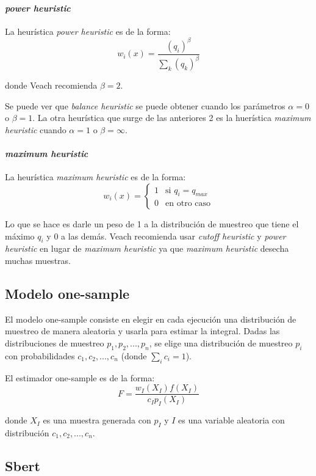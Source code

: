 \documentclass{article}
\begin{document}
\paragraph{\textit{power heuristic}} La heurística \textit{power heuristic} es de la forma:
$$ w_{i}(x) = \frac{(q_{i})^{\beta}}{\sum_{k} (q_{k})^{\beta}}$$

donde Veach recomienda $\beta = 2$.

Se puede ver que \textit{balance heuristic} se puede obtener cuando los parámetros $\alpha = 0$ o $\beta = 1$.
La otra heurística que surge de las anteriores 2 es la huerística \textit{maximum heuristic} cuando $\alpha = 1$ o $\beta = \infty$.

\paragraph{\textit{maximum heuristic}} La heurística \textit{maximum heuristic} es de la forma:
$$ w_{i}(x) = \begin{cases} 1 & \text{si } q_{i} = q_{max} \\ 0 & \text{en otro caso} \end{cases}$$

Lo que se hace es darle un peso de 1 a la distribución de muestreo que tiene el máximo $q_{i}$ y 0 a las demás.
Veach recomienda usar \textit{cutoff heuristic} y \textit{power heuristic} en lugar de \textit{maximum heuristic} ya que \textit{maximum heuristic} desecha muchas muestras.

\subsection{Modelo one-sample}

El modelo one-sample consiste en elegir en cada ejecución una distribución de muestreo de manera aleatoria y usarla para estimar la integral.
Dadas las distribuciones de muestreo $p_{1}, p_{2}, ..., p_{n}$, se elige una distribución de muestreo $p_{i}$ con probabilidades $c_{1}, c_{2}, ..., c_{n}$ (donde $\sum_{i} c_{i} = 1$).

El estimador one-sample es de la forma:
$$F = \frac{w_{I}(X_{I}) f(X_{I})}{c_{I} p_{I}(X_{I})}$$

donde $X_{I}$ es una muestra generada con $p_{I}$ y $I$ es una variable aleatoria con distribución $c_{1}, c_{2}, ..., c_{n}$.

\subsection{Sbert}
\end{document}
